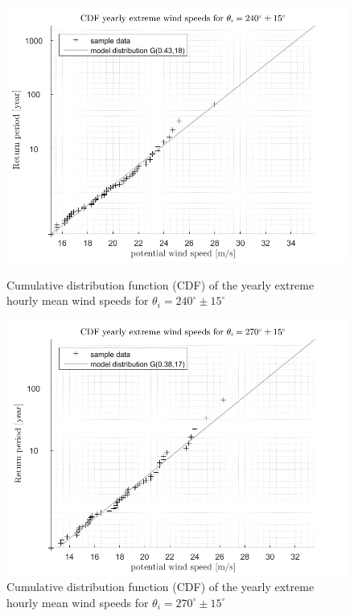\begin{figure}[H]
	\begin{minipage}[]{0.5\textwidth}
		\centering
		\includegraphics[scale=0.4]{images/CDF_yearly_extreme_windspeeds_G}
		\caption{Cumulative distribution  function (CDF) of the yearly extreme hourly mean wind speeds for $\theta_i=240^{\circ}\pm 15^{\circ}$}
		\label{figure_V_240}
	\end{minipage}
	\hspace{0.4cm}
	\begin{minipage}[]{0.5\textwidth}
		\centering
		\includegraphics[scale=0.4]{images/CDF_yearly_extreme_windspeeds_G270}
		\caption{Cumulative distribution function (CDF) of the yearly extreme hourly mean wind speeds for $\theta_i=270^{\circ}\pm 15^{\circ}$}
		\label{figure_V_270}
	\end{minipage}
\end{figure}

